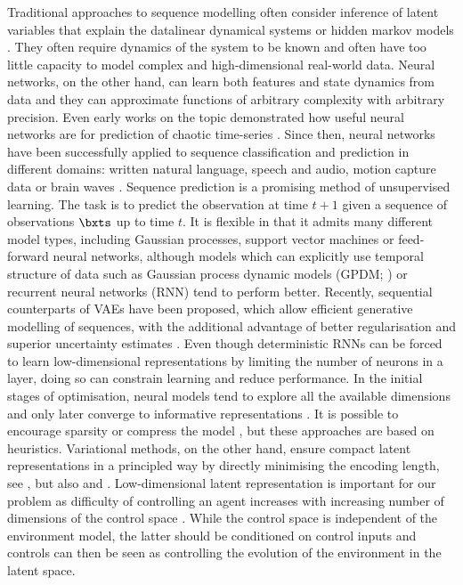         Traditional approaches to sequence modelling often consider inference of latent variables that explain the data\eg linear dynamical systems or hidden markov models \citep{Bishop2006}.
        They often require dynamics of the system to be known and often have too little capacity to model complex and high-dimensional real-world data.
        Neural networks, on the other hand, can learn both features and state dynamics from data and they can approximate functions of arbitrary complexity with arbitrary precision.
        Even early works on the topic demonstrated how useful neural networks are for prediction of chaotic time-series \citep{Lapedes1988}.
        Since then, neural networks have been successfully applied to sequence classification and prediction in different domains: written natural language, speech and audio, motion capture data or brain waves \citep{Langkvist2014,Bayer2015,Fortunato2017}.
%
%
        Sequence prediction is a promising method of unsupervised learning. The task is to predict the observation at time $t+1$ given a sequence of observations $\bxts$ up to time $t$. It is flexible in that it admits many different model types, including Gaussian processes, support vector machines or feed-forward neural networks, although models which can explicitly use temporal structure of data such as Gaussian process dynamic models (GPDM; \cite{Wang2008}) or recurrent neural networks (RNN) tend to perform better. Recently, sequential counterparts of VAEs have been proposed, which allow efficient generative modelling of sequences, with the additional advantage of better regularisation and superior uncertainty estimates \citep{Fabius2015,Bayer2015,Karl2017,Fortunato2017}. 
        Even though deterministic RNNs can be forced to learn low-dimensional representations by limiting the number of neurons in a layer, doing so can constrain learning and reduce performance. 
        In the initial stages of optimisation, neural models tend to explore all the available dimensions and only later converge to informative representations \citep{Shwartz-Ziv2017}.
        It is possible to encourage sparsity \citep{Engelcke2016} or compress the model \citep{Han2015}, but these approaches are based on heuristics. 
        Variational methods, on the other hand, ensure compact latent representations in a principled way by directly minimising the encoding length, see , but also \cite{Bishop2006} and \cite{Burda2015}. 
        Low-dimensional latent representation is important for our problem as difficulty of controlling an agent increases with increasing number of dimensions of the control space \citep{Watter2015}. While the control space is independent of the environment model, the latter should be conditioned on control inputs and controls can then be seen as controlling the evolution of the environment in the latent space.       
 
